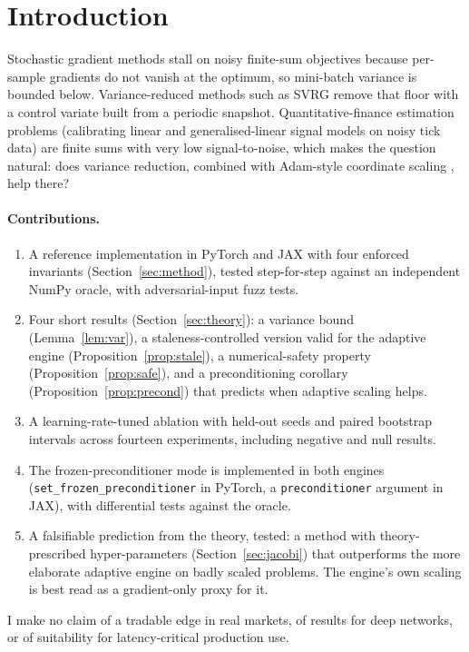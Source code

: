 \documentclass[11pt]{article}
\theoremstyle{remark}
\begin{document}
\section{Introduction}
Stochastic gradient methods stall on noisy finite-sum objectives because per-sample gradients do not vanish at the optimum, so mini-batch variance is bounded below. Variance-reduced methods such as SVRG \cite{johnson2013} remove that floor with a control variate built from a periodic snapshot. Quantitative-finance estimation problems (calibrating linear and generalised-linear signal models on noisy tick data) are finite sums with very low signal-to-noise, which makes the question natural: does variance reduction, combined with Adam-style coordinate scaling \cite{kingma2015}, help there?

\paragraph{Contributions.}
\begin{enumerate}[leftmargin=*,itemsep=2pt]
\item A reference implementation in PyTorch and JAX with four enforced invariants (Section~\ref{sec:method}), tested step-for-step against an independent NumPy oracle, with adversarial-input fuzz tests.
\item Four short results (Section~\ref{sec:theory}): a variance bound (Lemma~\ref{lem:var}), a staleness-controlled version valid for the adaptive engine (Proposition~\ref{prop:stale}), a numerical-safety property (Proposition~\ref{prop:safe}), and a preconditioning corollary (Proposition~\ref{prop:precond}) that predicts when adaptive scaling helps.
\item A learning-rate-tuned ablation with held-out seeds and paired bootstrap intervals across fourteen experiments, including negative and null results.
\item The frozen-preconditioner mode is implemented in both engines (\texttt{set\_frozen\_preconditioner} in PyTorch, a \texttt{preconditioner} argument in JAX), with differential tests against the oracle.
\item A falsifiable prediction from the theory, tested: a method with theory-prescribed hyper-parameters (Section~\ref{sec:jacobi}) that outperforms the more elaborate adaptive engine on badly scaled problems. The engine's own scaling is best read as a gradient-only proxy for it.
\end{enumerate}
I make no claim of a tradable edge in real markets, of results for deep networks, or of suitability for latency-critical production use.
\end{document}
